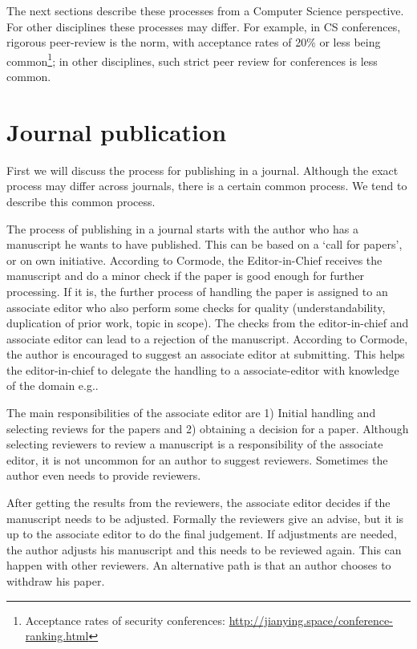 \documentclass{ou-report}
\newcommand{\outline}[1]{{\color{blue} #1}}
\begin{document}
The next sections describe these processes from a Computer Science perspective. 
For other disciplines these processes may differ. For example, in CS 
conferences, rigorous peer-review is the norm, with acceptance rates of 20\% or 
less being common\footnote{Acceptance rates of security conferences: \url{http://jianying.space/conference-ranking.html}}; in other disciplines, such strict peer review for conferences is
less common.
    


\section{Journal publication}

First we will discuss the process for publishing in a journal. Although the 
exact process may differ across journals, there is a certain common process. We 
tend to describe this common process.

The process of publishing in a journal starts with the author who has a manuscript 
he wants to have published. This can be based on a `call for papers', or on own 
initiative. According to Cormode, the Editor-in-Chief receives the manuscript 
and do a minor check if the paper is good enough for further processing. If it 
is, the further process of handling the paper is assigned to an associate editor 
who also perform some checks for quality (understandability, duplication of 
prior work, topic in scope). The checks from the editor-in-chief and associate 
editor can lead to a rejection of the manuscript. According to Cormode, the 
author is encouraged to suggest an associate editor at submitting. This helps 
the editor-in-chief to delegate the handling to a associate-editor with 
knowledge of the domain e.g..

The main responsibilities of the associate editor are 1) Initial handling and 
selecting reviews for the papers and 2) obtaining a decision for a paper. 
Although selecting reviewers to review a manuscript is a responsibility of the 
associate editor, it is not uncommon for an author to suggest reviewers. 
Sometimes the author even needs to provide reviewers.

After getting the results from the reviewers, the associate editor decides if 
the manuscript needs to be adjusted. Formally the reviewers give an advise, but 
it is up to the associate editor to do the final judgement. If adjustments are 
needed, the author adjusts his manuscript and this needs to be reviewed again. 
This can happen with other reviewers. An alternative path is that an author 
chooses to withdraw his paper.
\end{document}
